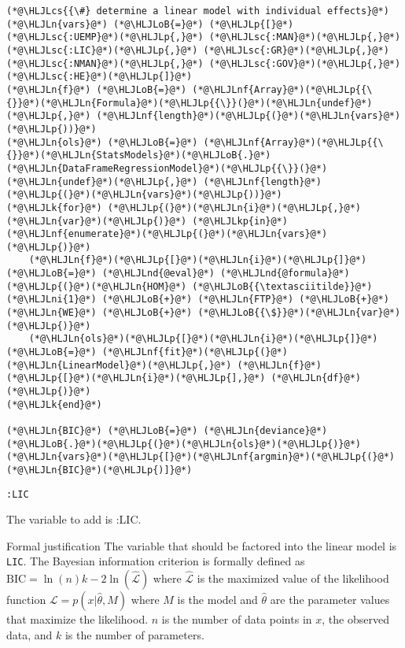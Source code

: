 \documentclass[12pt,a4paper]{article}
\newcommand{\HLJLk}[1]{\textcolor[RGB]{148,91,176}{\textbf{#1}}}
\newcommand{\HLJLkp}[1]{\textcolor[RGB]{148,91,176}{\textbf{#1}}}
\newcommand{\HLJLn}[1]{#1}
\newcommand{\HLJLnd}[1]{\textcolor[RGB]{214,102,97}{#1}}
\newcommand{\HLJLnf}[1]{\textcolor[RGB]{66,102,213}{#1}}
\newcommand{\HLJLsc}[1]{\textcolor[RGB]{201,61,57}{#1}}
\newcommand{\HLJLni}[1]{\textcolor[RGB]{59,151,46}{#1}}
\newcommand{\HLJLoB}[1]{\textcolor[RGB]{102,102,102}{\textbf{#1}}}
\newcommand{\HLJLp}[1]{#1}
\newcommand{\HLJLcs}[1]{\textcolor[RGB]{153,153,119}{\textit{#1}}}
\begin{document}
\begin{lstlisting}
(*@\HLJLcs{{\#} determine a linear model with individual effects}@*)
(*@\HLJLn{vars}@*) (*@\HLJLoB{=}@*) (*@\HLJLp{[}@*)(*@\HLJLsc{:UEMP}@*)(*@\HLJLp{,}@*) (*@\HLJLsc{:MAN}@*)(*@\HLJLp{,}@*) (*@\HLJLsc{:LIC}@*)(*@\HLJLp{,}@*) (*@\HLJLsc{:GR}@*)(*@\HLJLp{,}@*) (*@\HLJLsc{:NMAN}@*)(*@\HLJLp{,}@*) (*@\HLJLsc{:GOV}@*)(*@\HLJLp{,}@*) (*@\HLJLsc{:HE}@*)(*@\HLJLp{]}@*)
(*@\HLJLn{f}@*) (*@\HLJLoB{=}@*) (*@\HLJLnf{Array}@*)(*@\HLJLp{{\{}}@*)(*@\HLJLn{Formula}@*)(*@\HLJLp{{\}}(}@*)(*@\HLJLn{undef}@*)(*@\HLJLp{,}@*) (*@\HLJLnf{length}@*)(*@\HLJLp{(}@*)(*@\HLJLn{vars}@*)(*@\HLJLp{))}@*)
(*@\HLJLn{ols}@*) (*@\HLJLoB{=}@*) (*@\HLJLnf{Array}@*)(*@\HLJLp{{\{}}@*)(*@\HLJLn{StatsModels}@*)(*@\HLJLoB{.}@*)(*@\HLJLn{DataFrameRegressionModel}@*)(*@\HLJLp{{\}}(}@*)(*@\HLJLn{undef}@*)(*@\HLJLp{,}@*) (*@\HLJLnf{length}@*)(*@\HLJLp{(}@*)(*@\HLJLn{vars}@*)(*@\HLJLp{))}@*)
(*@\HLJLk{for}@*) (*@\HLJLp{(}@*)(*@\HLJLn{i}@*)(*@\HLJLp{,}@*) (*@\HLJLn{var}@*)(*@\HLJLp{)}@*) (*@\HLJLkp{in}@*) (*@\HLJLnf{enumerate}@*)(*@\HLJLp{(}@*)(*@\HLJLn{vars}@*)(*@\HLJLp{)}@*)
    (*@\HLJLn{f}@*)(*@\HLJLp{[}@*)(*@\HLJLn{i}@*)(*@\HLJLp{]}@*) (*@\HLJLoB{=}@*) (*@\HLJLnd{@eval}@*) (*@\HLJLnd{@formula}@*)(*@\HLJLp{(}@*)(*@\HLJLn{HOM}@*) (*@\HLJLoB{{\textasciitilde}}@*) (*@\HLJLni{1}@*) (*@\HLJLoB{+}@*) (*@\HLJLn{FTP}@*) (*@\HLJLoB{+}@*) (*@\HLJLn{WE}@*) (*@\HLJLoB{+}@*) (*@\HLJLoB{{\$}}@*)(*@\HLJLn{var}@*)(*@\HLJLp{)}@*)
    (*@\HLJLn{ols}@*)(*@\HLJLp{[}@*)(*@\HLJLn{i}@*)(*@\HLJLp{]}@*) (*@\HLJLoB{=}@*) (*@\HLJLnf{fit}@*)(*@\HLJLp{(}@*)(*@\HLJLn{LinearModel}@*)(*@\HLJLp{,}@*) (*@\HLJLn{f}@*)(*@\HLJLp{[}@*)(*@\HLJLn{i}@*)(*@\HLJLp{],}@*) (*@\HLJLn{df}@*)(*@\HLJLp{)}@*)
(*@\HLJLk{end}@*)

(*@\HLJLn{BIC}@*) (*@\HLJLoB{=}@*) (*@\HLJLn{deviance}@*)(*@\HLJLoB{.}@*)(*@\HLJLp{(}@*)(*@\HLJLn{ols}@*)(*@\HLJLp{)}@*)
(*@\HLJLn{vars}@*)(*@\HLJLp{[}@*)(*@\HLJLnf{argmin}@*)(*@\HLJLp{(}@*)(*@\HLJLn{BIC}@*)(*@\HLJLp{)]}@*)
\end{lstlisting}

\begin{lstlisting}
:LIC
\end{lstlisting}


The variable to add is :LIC.


Formal justification The variable that should be factored into the linear model is \texttt{LIC}. The Bayesian information criterion is formally defined as $\mathrm{BIC} = \ln(n)k - 2 \ln(\hat{\mathcal{L}})$ where $\hat{\mathcal{L}}$ is the maximized value of the likelihood function $\mathcal{L} = p(x | \hat{\theta}, M)$ where $M$ is the model and $\hat{\theta}$ are the parameter values that maximize the likelihood. $n$ is the number of data points in $x$, the observed data, and $k$ is the number of parameters.
\end{document}
